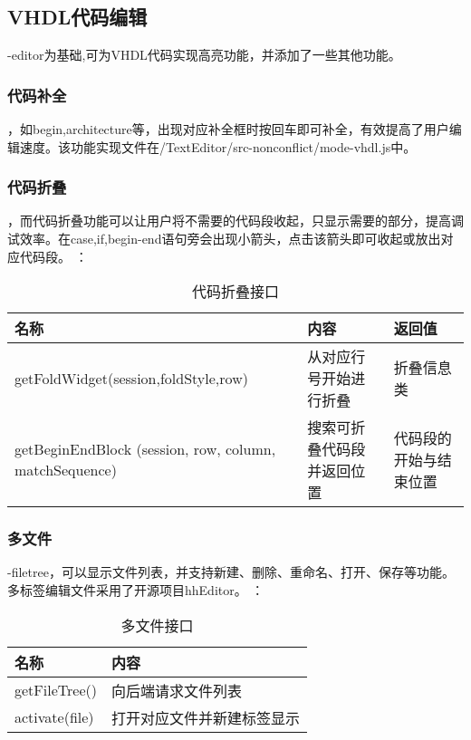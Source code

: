 \documentclass{article}
\begin{document}
\begin{CJK}{UTF8}{gbsn}
\subsection{VHDL代码编辑}
    -editor为基础,可为VHDL代码实现高亮功能，并添加了一些其他功能。

\subsubsection{代码补全}
    ，如begin,architecture等，出现对应补全框时按回车即可补全，有效提高了用户编辑速度。该功能实现文件在/TextEditor/src-nonconflict/mode-vhdl.js中。

\subsubsection{代码折叠}
    ，而代码折叠功能可以让用户将不需要的代码段收起，只显示需要的部分，提高调试效率。在case,if,begin-end语句旁会出现小箭头，点击该箭头即可收起或放出对应代码段。
    ：
    \begin{table}[!h]
    \begin{tabular}{|l|l|l|}
    \hline
    名称 & 内容 & 返回值 \\
    \hline
    getFoldWidget(session,foldStyle,row) & 从对应行号开始进行折叠 & 折叠信息类 \\
    \hline
    getBeginEndBlock (session, row, column, matchSequence) & 搜索可折叠代码段并返回位置 & 代码段的开始与结束位置 \\
    \hline
    \end{tabular}
    \caption{代码折叠接口}
    \end{table}

\subsubsection{多文件}
    -filetree，可以显示文件列表，并支持新建、删除、重命名、打开、保存等功能。多标签编辑文件采用了开源项目hhEditor。
    ：
    \begin{table}[!h]
    \begin{tabular}{|l|l|}
    \hline
    名称 & 内容  \\
    \hline
    getFileTree() & 向后端请求文件列表 \\
    \hline
    activate(file) & 打开对应文件并新建标签显示 \\
    \hline
    \end{tabular}
    \caption{多文件接口}
    \end{table}


\end{CJK}
\end{document}
